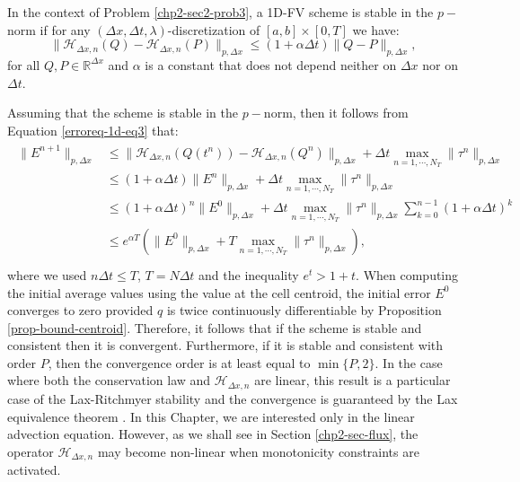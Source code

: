 \begin{definition}[Stability]
	In the context of Problem  \ref{chp2-sec2-prob3},
	a 1D-FV scheme is stable in the $p-$norm if for any $(\Delta x, \Delta t, \lambda)$-discretization of $[a,b]\times [0,T]$ we have:
	\begin{equation}
		\|\mathcal{H}_{\Delta x,n}(Q) - \mathcal{H}_{\Delta x,n}(P)\|_{p,\Delta x} \leq (1+\alpha \Delta t)  \|Q-P\|_{p,\Delta x},
	\end{equation}
	for all $Q, P \in \mathbb{R}^{\Delta x}$ and $\alpha$ is a constant
	that does not depend neither on $\Delta x$ nor on  $\Delta t$.
\end{definition}
Assuming that the scheme is stable in the $p-$norm, then it follows from Equation \eqref{erroreq-1d-eq3} that:
\begin{align}
	\label{chp2-sec2-erroreq}
	\begin{split}
	\|E^{n+1}\|_{p,\Delta x} 
	&\leq \|\mathcal{H}_{\Delta x,n}(Q(t^n)) - \mathcal{H}_{\Delta x,n}(Q^n)\|_{p,\Delta x} +  \Delta t \max_{n=1, \cdots, N_T}\|\tau^n\|_{p,\Delta x}\\
	&\leq (1+\alpha \Delta t)\|E^n\|_{p,\Delta x} +  \Delta t \max_{n=1, \cdots, N_T}\|\tau^n\|_{p,\Delta x}\\
	&\leq (1+\alpha \Delta t)^n\|E^0\|_{p,\Delta x} +  \Delta t \max_{n=1, \cdots, N_T}\|\tau^n\|_{p,\Delta x}
	\sum_{k=0}^{n-1} (1+\alpha \Delta t)^k\\
  &\leq e^{\alpha T}(\|E^0\|_{p,\Delta x} + T\max_{n=1, \cdots, N_T}\|\tau^n\|_{p,\Delta x}), \\
	\end{split}
\end{align}
where we used $n \Delta t\leq T $, $T=N\Delta t$ and the inequality $e^t> 1+t$.
When computing the initial average values using the value at the cell centroid, 
the initial error $E^0$ converges to zero provided $q$ is twice continuously differentiable
by Proposition \ref{prop-bound-centroid}.
Therefore, it follows that if the scheme is stable and consistent
then it is convergent. 
Furthermore, if it is stable and consistent with order $P$, then
the convergence order is at least equal to $\min\{{P,2}\}$.
In the case where both the conservation law and $\mathcal{H}_{\Delta x,n}$ are linear,
this result is a particular case of the Lax-Ritchmyer stability and the convergence
is guaranteed by the Lax equivalence theorem \citep{leveque:2002}.
In this Chapter, we are interested only in the linear advection equation.
However, as we shall see in Section \ref{chp2-sec-flux}, the operator $\mathcal{H}_{\Delta x,n}$
may become non-linear when monotonicity constraints are activated.

